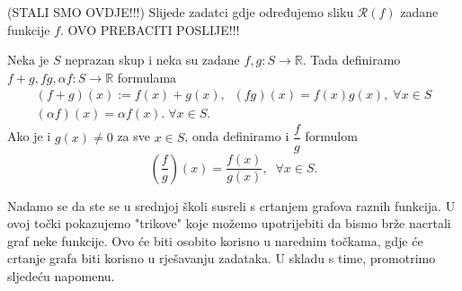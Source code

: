 (STALI SMO OVDJE!!!) Slijede zadatci gdje određujemo sliku \(\mathcal{R}(f)\) zadane funkcije \(f\). OVO PREBACITI POSLIJE!!!
\begin{definition}
Neka je \(S\) neprazan skup i neka su zadane \(f, g : S\to \mathbb{R}\). Tada definiramo \(f+g, fg, \alpha f : S\to \mathbb{R}\) formulama
\begin{gather*}
(f+g)(x):=f(x)+g(x),\;\;(fg)(x)=f(x)g(x),\;\forall x\in S\\
(\alpha f)(x)=\alpha f(x).\;\forall x\in S.
\end{gather*}
Ako je i \(g(x)\neq 0\) za sve \(x\in S\), onda definiramo i \(\dfrac{f}{g}\) formulom \[\left(\dfrac{f}{g}\right)(x)=\dfrac{f(x)}{g(x)},\;\;\forall x\in S.\]
\end{definition}

Nadamo se da ste se u srednjoj školi susreli s crtanjem grafova raznih funkcija. U ovoj točki pokazujemo "trikove" koje možemo upotrijebiti da bismo brže nacrtali graf neke funkcije. Ovo će biti osobito korisno u narednim točkama, gdje će crtanje grafa biti korisno u rješavanju zadataka. U skladu s time, promotrimo sljedeću napomenu.
